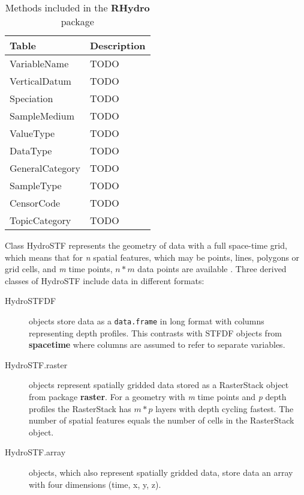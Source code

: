 \documentclass{icldt}\usepackage[]{graphicx}\usepackage[]{color}
\begin{document}
\begin{table*}[t]
\caption{Methods included in the \textbf{RHydro} package}
\begin{tabular}{ p{3.5cm} p{8.5cm} }
\toprule
Table           & Description \\
\midrule
VariableName    & TODO \\
VerticalDatum   & TODO \\
Speciation      & TODO \\
SampleMedium    & TODO \\
ValueType       & TODO \\
DataType        & TODO \\
GeneralCategory & TODO \\
SampleType      & TODO \\
CensorCode      & TODO \\
TopicCategory   & TODO \\
\bottomrule
\end{tabular}
\label{table:cvtables}
\end{table*}

Class HydroSTF represents the geometry of data with a full space-time grid, which means that for \textit{n} spatial features, which may be points, lines, polygons or grid cells, and \textit{m} time points, $n*m$ data points are available \citep{pebesma2012}. Three derived classes of HydroSTF include data in different formats:

\begin{description}
  \item[HydroSTFDF] objects store data as a \texttt{data.frame} in long format with columns representing depth profiles. This contrasts with STFDF objects from \textbf{spacetime} where columns are assumed to refer to separate variables.
  
  \item[HydroSTF.raster] objects represent spatially gridded data stored as a RasterStack object from package \textbf{raster}. For a geometry with \textit{m} time points and \textit{p} depth profiles the RasterStack has $m*p$ layers with depth cycling fastest. The number of spatial features equals the number of cells in the RasterStack object.
  
  \item[HydroSTF.array] objects, which also represent spatially gridded data, store data an array with four dimensions (time, x, y, z).
\end{description}
\end{document}
